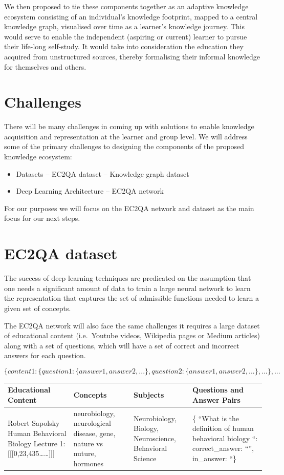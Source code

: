 \documentclass[]{book}
\providecommand{\tightlist}{%
  \setlength{\itemsep}{0pt}\setlength{\parskip}{0pt}}
\theoremstyle{definition}
\theoremstyle{definition}
\theoremstyle{definition}
\theoremstyle{remark}
\begin{document}
We then proposed to tie these components together as an adaptive
knowledge ecosystem consisting of an individual's knowledge footprint,
mapped to a central knowledge graph, visualised over time as a learner's
knowledge journey. This would serve to enable the independent (aspiring
or current) learner to pursue their life-long self-study. It would take
into consideration the education they acquired from unstructured
sources, thereby formalising their informal knowledge for themselves and
others.

\section{Challenges}\label{challenges}

There will be many challenges in coming up with solutions to enable
knowledge acquisition and representation at the learner and group level.
We will address some of the primary challenges to designing the
components of the proposed knowledge ecosystem:

\begin{itemize}
\tightlist
\item
  Datasets -- EC2QA dataset -- Knowledge graph dataset
\item
  Deep Learning Architecture -- EC2QA network
\end{itemize}

For our purposes we will focus on the EC2QA network and dataset as the
main focus for our next steps.

\section{EC2QA dataset}\label{ec2qa-dataset}

The success of deep learning techniques are predicated on the assumption
that one needs a significant amount of data to train a large neural
network to learn the representation that captures the set of admissible
functions needed to learn a given set of concepts.

The EC2QA network will also face the same challenges it requires a large
dataset of educational content (i.e.~Youtube videos, Wikipedia pages or
Medium articles) along with a set of questions, which will have a set of
correct and incorrect answers for each question.

\[
 \{content1: \{question1: \{answer1, answer2,...\},  question2: \{answer1, answer2,...\},...\},...
\]

\begin{tabular}{l|l|l|l}
\hline
Educational Content & Concepts & Subjects & Questions and Answer Pairs\\
\hline
Robert Sapolsky  Human Behavioral Biology Lecture 1: [[[0,23,435……]]] & neurobiology, neurological disease, gene, nature vs nuture, hormones & Neurobiology, Biology, Neuroscience, Behavioral Science & \{ “What is the definition of human behavioral biology “: correct\_answer: “”, in\_answer: “\}\\
\hline
\end{tabular}
\end{document}
